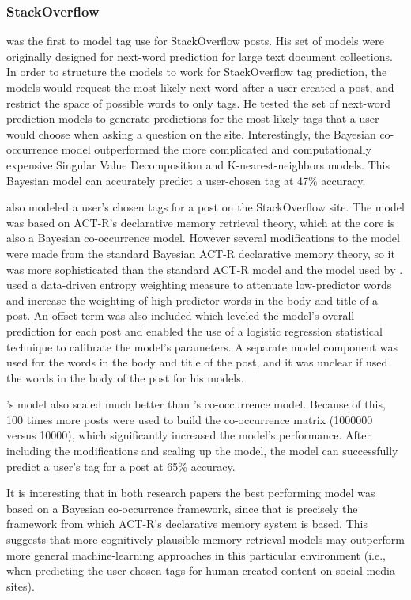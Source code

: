 \documentclass[man,floatsintext,donotrepeattitle]{apa6}
\begin{document}
\subsubsection{StackOverflow}

\textcite{Kuo2011} was the first to model tag use for StackOverflow posts.
His set of models were originally designed for next-word prediction for large text document collections.
In order to structure the models to work for StackOverflow tag prediction, the models would request the most-likely next word after a user created a post, and restrict the space of possible words to only tags.
He tested the set of next-word prediction models to generate predictions for the most likely tags that a user would choose when asking a question on the site.
Interestingly, the Bayesian co-occurrence model outperformed the more complicated and computationally expensive Singular Value Decomposition and K-nearest-neighbors models.
This Bayesian model can accurately predict a user-chosen tag at 47\% accuracy.

\textcite{Stanley2013} also modeled a user's chosen tags for a post on the StackOverflow site.
The model was based on ACT-R's declarative memory retrieval theory, which at the core is also a Bayesian co-occurrence model.
However several modifications to the model were made from the standard Bayesian ACT-R declarative memory theory, so it was more sophisticated than the standard ACT-R model and the model used by \textcite{Kuo2011}.
\citeauthor{Stanley2013} used a data-driven entropy weighting measure to attenuate low-predictor words and increase the weighting of high-predictor words in the body and title of a post.
An offset term was also included which leveled the model's overall prediction for each post and enabled the use of a logistic regression statistical technique to calibrate the model's parameters.
A separate model component was used for the words in the body and title of the post, and it was unclear if \citeauthor{Kuo2011} used the words in the body of the post for his models.

\citeauthor{Stanley2013}'s model also scaled much better than \citeauthor{Kuo2011}'s co-occurrence model. 
Because of this, 100 times more posts were used to build the co-occurrence matrix (\num{1000000} versus \num{10000}), which significantly increased the model's performance.
After including the modifications and scaling up the model, the model can successfully predict a user's tag for a post at 65\% accuracy.

It is interesting that in both research papers the best performing model was based on a Bayesian co-occurrence framework, since that is precisely the framework from which ACT-R's declarative memory system is based.
This suggests that more cognitively-plausible memory retrieval models may outperform more general machine-learning approaches in this particular environment
(i.e., when predicting the user-chosen tags for human-created content on social media sites).
\end{document}
